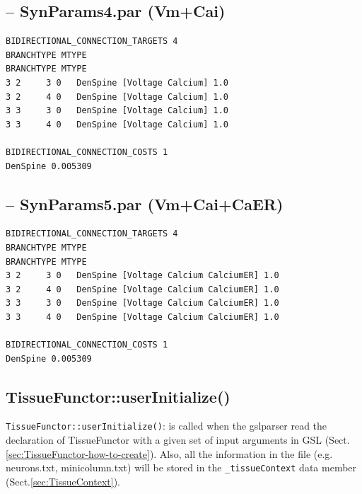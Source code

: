 \subsection{-- SynParams4.par (Vm+Cai)}

\begin{verbatim}
BIDIRECTIONAL_CONNECTION_TARGETS 4
BRANCHTYPE MTYPE
BRANCHTYPE MTYPE 
3 2     3 0   DenSpine [Voltage Calcium] 1.0
3 2     4 0   DenSpine [Voltage Calcium] 1.0
3 3     3 0   DenSpine [Voltage Calcium] 1.0
3 3     4 0   DenSpine [Voltage Calcium] 1.0

BIDIRECTIONAL_CONNECTION_COSTS 1
DenSpine 0.005309
\end{verbatim}

\subsection{-- SynParams5.par (Vm+Cai+CaER)}

\begin{verbatim}
BIDIRECTIONAL_CONNECTION_TARGETS 4
BRANCHTYPE MTYPE
BRANCHTYPE MTYPE 
3 2     3 0   DenSpine [Voltage Calcium CalciumER] 1.0
3 2     4 0   DenSpine [Voltage Calcium CalciumER] 1.0
3 3     3 0   DenSpine [Voltage Calcium CalciumER] 1.0
3 3     4 0   DenSpine [Voltage Calcium CalciumER] 1.0

BIDIRECTIONAL_CONNECTION_COSTS 1
DenSpine 0.005309
\end{verbatim}


\subsection{TissueFunctor::userInitialize()}
\label{sec:TissueFunctor-how-it-works-underlying}

\verb!TissueFunctor::userInitialize()!: is called when the gslparser read the
declaration of TissueFunctor with a given set of input arguments in GSL
(Sect.\ref{sec:TissueFunctor-how-to-create}). Also, all the information in the
file (e.g. neurons.txt, minicolumn.txt) will be stored in the
\verb!_tissueContext! data member (Sect.\ref{sec:TissueContext}).

